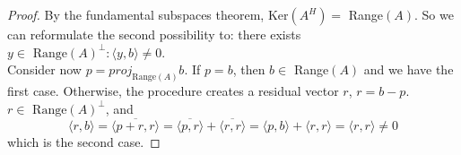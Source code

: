 \documentclass[12pt]{article}
\newenvironment{problem}[2][Problem]{\begin{trivlist}
\item[\hskip \labelsep {\bfseries #1}\hskip \labelsep {\bfseries #2.}]}{\end{trivlist}}
\theoremstyle{definition}
\theoremstyle{definition}
\theoremstyle{definition}
\theoremstyle{definition}
\begin{document}
\begin{problem}{3.44}
\begin{proof}
 By the fundamental subspaces theorem, Ker$(A^H) =$ Range$(A)$. So we can reformulate the second possibility to: there exists $y \in \text{ Range}(A)^\perp : \langle y, b \rangle \neq 0 $. \\
 Consider now $p = proj_{\text{Range}(A)}b$. If $p = b$, then $b \in$ Range$(A)$ and we have the first case. Otherwise, the procedure creates a residual vector $r$, $r = b - p$. $r \in \text{ Range}(A)^\perp$, and 
$$\langle r, b \rangle = \overline{\langle p + r, r \rangle} = \overline{\langle p, r \rangle} + \overline{\langle r, r \rangle} = \langle p, b \rangle + \langle r, r \rangle = \langle r, r \rangle \neq 0$$
which is the second case. 
\end{proof}
\end{problem}

\begin{problem}{3.45}
\end{problem}

\begin{problem}{3.47}
\end{problem}

\begin{problem}{3.48}
\end{problem}

\begin{problem}{3.50}
\end{problem}
\end{document}
